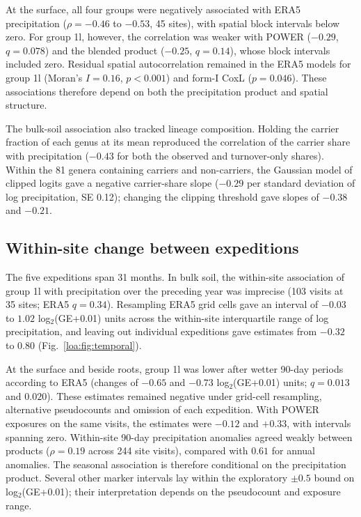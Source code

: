 At the surface, all four groups were negatively associated with ERA5 precipitation ($\rho=-0.46$ to
$-0.53$, 45 sites), with spatial block intervals below zero. For group 1l, however, the correlation
was weaker with POWER ($-0.29$, $q=0.078$) and the blended product ($-0.25$, $q=0.14$), whose block
intervals included zero. Residual spatial autocorrelation remained in the ERA5 models for group 1l
(Moran's $I=0.16$, $p<0.001$) and form-I CoxL ($p=0.046$). These associations therefore depend on
both the precipitation product and spatial structure.

The bulk-soil association also tracked lineage composition. Holding the carrier fraction of each genus
at its mean reproduced the correlation of the carrier share with precipitation ($-0.43$ for both the
observed and turnover-only shares). Within the 81 genera containing carriers and non-carriers, the
Gaussian model of clipped logits gave a negative carrier-share slope ($-0.29$ per standard deviation of
log precipitation, SE 0.12); changing the clipping threshold gave slopes of $-0.38$ and $-0.21$.

\subsection*{Within-site change between expeditions}
The five expeditions span 31 months. In bulk soil, the within-site association of group 1l with
precipitation over the preceding year was imprecise (103 visits at 35 sites; ERA5 $q=0.34$).
Resampling ERA5 grid cells gave an interval of $-0.03$ to $1.02$ log$_2$(GE+0.01) units across the
within-site interquartile range of log precipitation, and leaving out individual expeditions gave
estimates from $-0.32$ to $0.80$ (Fig.~\ref{loa:fig:temporal}).

At the surface and beside roots, group 1l was lower after wetter 90-day periods according to ERA5
(changes of $-0.65$ and $-0.73$ log$_2$(GE+0.01) units; $q=0.013$ and $0.020$). These estimates
remained negative under grid-cell resampling, alternative pseudocounts and omission of each expedition.
With POWER exposures on the same visits, the estimates were $-0.12$ and $+0.33$, with intervals
spanning zero. Within-site 90-day precipitation anomalies agreed weakly between products
($\rho=0.19$ across 244 site visits), compared with $0.61$ for annual anomalies. The seasonal
association is therefore conditional on the precipitation product. Several other marker intervals
lay within the exploratory $\pm0.5$ bound on log$_2$(GE+0.01); their interpretation depends on the
pseudocount and exposure range.

